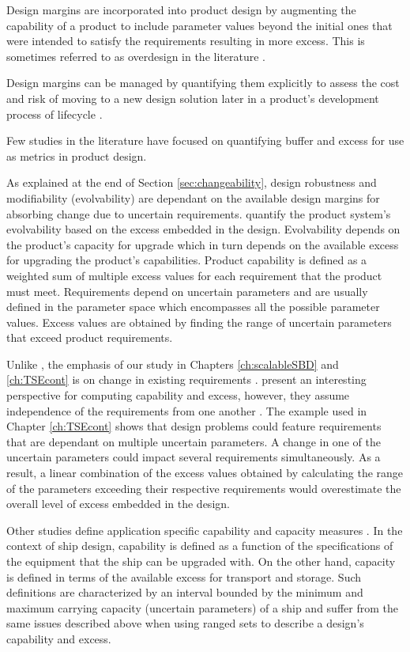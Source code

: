 Design margins are incorporated into product design by augmenting the capability of a product to include parameter values beyond the initial ones that were intended to satisfy the requirements resulting in more excess. This is sometimes referred to as overdesign in the literature \cite{Eckert2019}.

Design margins can be managed by quantifying them explicitly to assess the cost and risk of moving to a new design solution later in a product's development process of lifecycle \cite{Eckert2019}.

Few studies in the literature have focused on quantifying buffer and excess for use as metrics in product design.

As explained at the end of Section \ref{sec:changeability}, design robustness and modifiability (evolvability) are dependant on the available design margins for absorbing change due to uncertain requirements. \citeauthor{Tackett2014} quantify the product system's evolvability based on the excess embedded in the design. Evolvability depends on the product's capacity for upgrade which in turn depends on the available excess for upgrading the product's capabilities. Product capability is defined as a weighted sum of multiple excess values for each requirement that the product must meet. Requirements depend on uncertain parameters and are usually defined in the parameter space which encompasses all the possible parameter values. Excess values are obtained by finding the range of uncertain parameters that exceed product requirements.

Unlike \citeauthor{Tackett2014}, the emphasis of our study in Chapters \ref{ch:scalableSBD} and \ref{ch:TSEcont} is on change in existing requirements \cite{Tackett2014}. \citeauthor{Tackett2014} present an interesting perspective for computing capability and excess, however, they assume independence of the requirements from one another \cite{Tackett2014}. The example used in Chapter \ref{ch:TSEcont} shows that design problems could feature requirements that are dependant on multiple uncertain parameters. A change in one of the uncertain parameters could impact several requirements simultaneously. As a result, a linear combination of the excess values obtained by calculating the range of the parameters exceeding their respective requirements would overestimate the overall level of excess embedded in the design.

Other studies define application specific capability and capacity measures \cite{Rehn2018}. In the context of ship design, capability is defined as a function of the specifications of the equipment that the ship can be upgraded with. On the other hand, capacity is defined in terms of the available excess for transport and storage. Such definitions are characterized by an interval bounded by the minimum and maximum carrying capacity (uncertain parameters) of a ship and suffer from the same issues described above when using ranged sets to describe a design's capability and excess.

